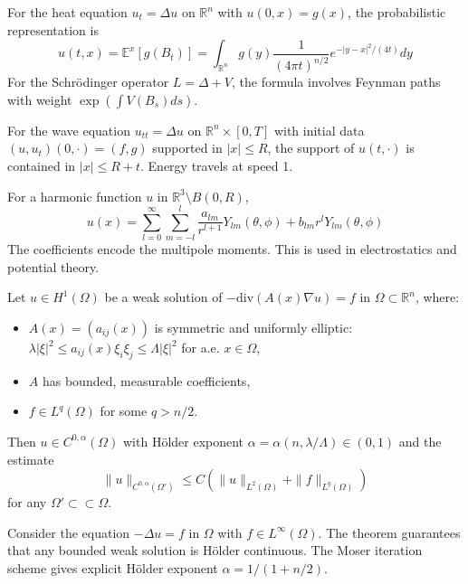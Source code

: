 \begin{example}
For the heat equation $u_t = \Delta u$ on $\mathbb{R}^n$ with $u(0,x) = g(x)$, the probabilistic representation is
\[ u(t,x) = \mathbb{E}^x[g(B_t)] = \int_{\mathbb{R}^n} g(y) \frac{1}{(4\pi t)^{n/2}} e^{-|y-x|^2/(4t)} dy \]
For the Schrödinger operator $L = \Delta + V$, the formula involves Feynman paths with weight $\exp(\int V(B_s)ds)$.
\end{example}

\begin{example}
For the wave equation $u_{tt} = \Delta u$ on $\mathbb{R}^n \times [0,T]$ with initial data $(u, u_t)(0,\cdot) = (f,g)$ supported in $|x| \leq R$, the support of $u(t,\cdot)$ is contained in $|x| \leq R + t$. Energy travels at speed 1.
\end{example}

\begin{example}
For a harmonic function $u$ in $\mathbb{R}^3 \setminus B(0,R)$,
\[ u(x) = \sum_{l=0}^\infty \sum_{m=-l}^l \frac{a_{lm}}{r^{l+1}} Y_{lm}(\theta,\phi) + b_{lm} r^l Y_{lm}(\theta,\phi) \]
The coefficients encode the multipole moments. This is used in electrostatics and potential theory.
\end{example}

\begin{theorem}
Let $u \in H^1(\Omega)$ be a weak solution of $-\mathrm{div}(A(x)\nabla u) = f$ in $\Omega \subset \mathbb{R}^n$, where:
\begin{itemize}
    \item $A(x) = (a_{ij}(x))$ is symmetric and uniformly elliptic: $\lambda |\xi|^2 \leq a_{ij}(x)\xi_i\xi_j \leq \Lambda |\xi|^2$ for a.e. $x \in \Omega$,
    \item $A$ has bounded, measurable coefficients,
    \item $f \in L^q(\Omega)$ for some $q > n/2$.
\end{itemize}
Then $u \in C^{0,\alpha}(\Omega)$ with H\"older exponent $\alpha = \alpha(n, \lambda/\Lambda) \in (0,1)$ and the estimate
\[ \|u\|_{C^{0,\alpha}(\Omega')} \leq C\left(\|u\|_{L^2(\Omega)} + \|f\|_{L^q(\Omega)}\right) \]
for any $\Omega' \subset\subset \Omega$.
\end{theorem}

\begin{example}
Consider the equation $-\Delta u = f$ in $\Omega$ with $f \in L^\infty(\Omega)$. The theorem guarantees that any bounded weak solution is H\"older continuous. The Moser iteration scheme gives explicit H\"older exponent $\alpha = 1/(1+n/2)$.
\end{example}


